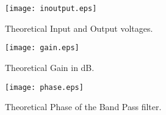 \begin{figure}[H] 
\centering
\texttt{[image: inoutput.eps]}
\caption{Theoretical Input and Output voltages.}
\label{Fig6: TheoVoltage}
\end{figure}

\begin{figure}[H] 
\centering
\texttt{[image: gain.eps]}
\caption{Theoretical Gain in dB.}
\label{Fig7: TheoGaindB}
\end{figure}

\begin{figure}[H] 
\centering
\texttt{[image: phase.eps]}
\caption{Theoretical Phase of the Band Pass filter.}
\label{Fig8: TheoPhasedB}
\end{figure}


